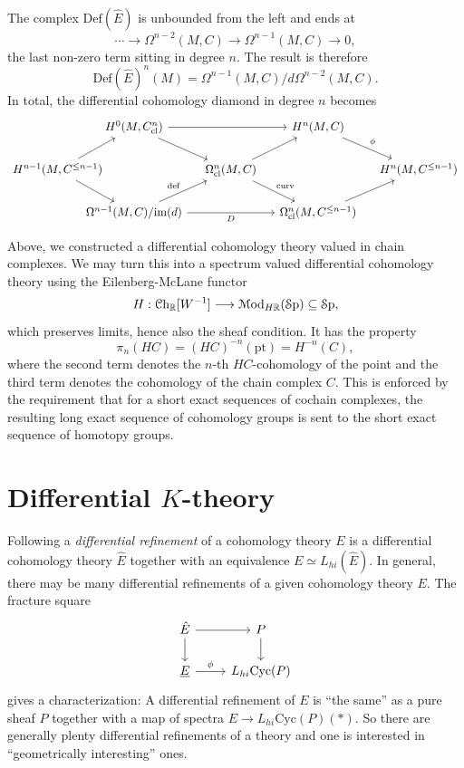 \documentclass[10pt]{amsart}
\begin{document}
The complex $\mathrm{Def}(\hat{E})$ is unbounded from the left and ends at
\[
\cdots \longrightarrow \Omega^{n-2}(M, C) \longrightarrow \Omega^{n-1}(M, C) \longrightarrow 0,
\]
the last non-zero term sitting in degree $n$. The result is therefore
\[
\mathrm{Def}(\hat{E})^n(M) = \Omega^{n-1}(M, C)/d\Omega^{n-2}(M, C).
\]
In total, the differential cohomology diamond in degree $n$ becomes
\begin{equation*}
\begin{tikzcd}[column sep=0.4cm]
&[-1.2cm] 
H^0(M, C^n_{\mathrm{cl}})
\ar[dr]\ar[rr]
& & 
H^n(M, C) 
\ar[dr, "\phi"] 
&
\\ 	
H^{n-1}(M, C^{\leq n-1})
\ar[ur]
\ar[dr]
& & 
\Omega^n_{\mathrm{cl}}(M, C)  
\ar[ur]
\ar[dr, "\mathrm{curv}"]
& & 
H^n(M, C^{\leq n-1})
\\
& 
\Omega^{n-1}(M, C)/\mathrm{im}(d)
\ar[ur, "\mathrm{def}"]
\ar[rr, "D"']
& & 
\Omega^n_{\mathrm{cl}}(M, C^{\leq n-1}) 
\ar[ur]
&
\end{tikzcd}
\end{equation*}

Above, we constructed a differential cohomology theory valued in chain complexes. We may turn this into a spectrum valued differential cohomology theory using the Eilenberg-McLane functor
\[
H : \mathcal{C}\mathrm{h}_{\mathbb{R}}[W^{-1}] \longrightarrow \mathcal{M}\mathrm{od}_{H\mathbb{R}}(\mathcal{S}\mathrm{p}) \subseteq \mathcal{S}\mathrm{p},
\]
which preserves limits, hence also the sheaf condition. It has the property
\[
\pi_n(HC) = (HC)^{-n}(\mathrm{pt}) = H^{-n}(C),
\]
where the second term denotes the $n$-th $HC$-cohomology of the point and the third term denotes the cohomology of the chain complex $C$. This is enforced by the requirement that for a short exact sequences of cochain complexes, the resulting long exact sequence of cohomology groups is sent to the short exact sequence of homotopy groups.

\section{Differential \texorpdfstring{$K$}{K}-theory}
Following \cite[Def.~3.6]{bunkenikolausvoelkl2016diffcoh} a \emph{differential refinement} of a  cohomology theory $E$ is a differential cohomology theory $\hat{E}$ together with an equivalence $E \simeq L_{hi}(\hat{E})$. In general, there may be many differential refinements of a given cohomology theory $E$. The fracture square
\[
\begin{tikzcd}
	\hat{E} \ar[d]\ar[r] & P
	\ar[d]
	\\
	\underline{E} \ar[r, "\phi"] &L_{hi}\mathrm{Cyc}(P)
\end{tikzcd}
\] 
gives a characterization: A differential refinement of $E$ is ``the same'' as a pure sheaf $P$ together with a map of spectra $E \to L_{hi}\mathrm{Cyc}(P)(*)$. So there are generally plenty differential refinements of a theory and one is interested in ``geometrically interesting'' ones.
\end{document}
